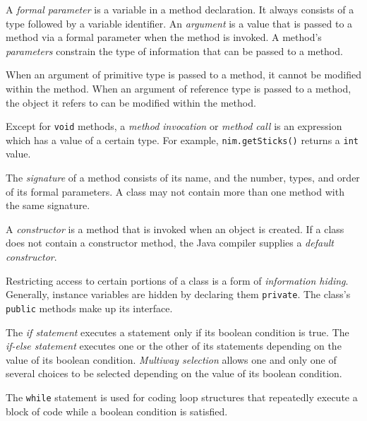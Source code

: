 \label{summaryof-important-points}
\begin{SMBL}
\item  A {\it formal parameter} is a variable in a method
declaration. It always consists of a type followed by a variable
identifier.  An {\it argument} is a value that is passed to a method
via a formal parameter when the method is invoked.   A method's
{\it parameters} constrain the type of information that can be passed to a
method.

\item  When an argument of primitive type is passed to a method, 
it cannot be modified within the method.  When an argument of
reference type is passed to a method, the object it refers to can be
modified within the method.

\item  Except for {\tt void} methods,
a {\it method invocation} or {\it method call} is an expression which
has a value of a certain type.  For example, {\tt nim.getSticks()}
returns a {\tt int} value.

\item  The {\it signature} of a method consists
of its name, and the number, types, and order of its formal
parameters.  A class may not contain more than one method with the same
signature.

\item  A {\it constructor} is a method that is invoked
when an object is created.  If a class does not contain a
constructor method, the Java compiler supplies a {\it default
constructor}.

\item  Restricting access to certain portions of a class is a form of
{\it information hiding}.
Generally, instance variables are hidden by declaring them
{\tt private}.  The class's {\tt public} methods make up its interface.

\item  The {\it if statement} executes a statement only if its boolean
condition is true.  The {\it if-else statement} executes one
or the other of its statements depending on the value of its boolean
condition.   {\it Multiway selection} allows one and only one of
several choices to be selected depending on the value of its boolean
condition.

\item  The {\tt while} statement is used for coding loop structures
that repeatedly execute a block of code while a boolean condition
is satisfied.

\end{SMBL}

